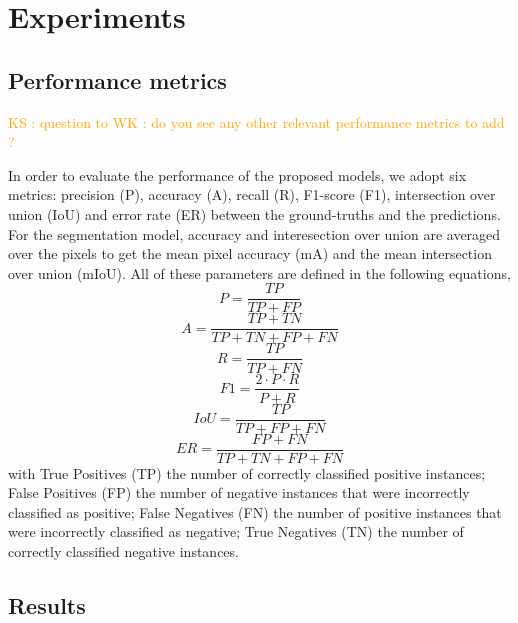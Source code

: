 \documentclass[amt, article]{copernicus}
\begin{document}
\section{Experiments}
\label{sec:experiments}

\subsection{Performance metrics}

\textcolor{orange}{KS : question to WK : do you see any other relevant performance metrics to add ?}

In order to evaluate the performance of the proposed models, we adopt six metrics: precision (P), accuracy (A), recall (R), F1-score (F1), intersection over union (IoU) and error rate (ER) between the ground-truths and the predictions. For the segmentation model, accuracy and interesection over union are averaged over the pixels to get the mean pixel accuracy (mA) and the mean intersection over union (mIoU). All of these parameters are defined in the following equations,
\begin{equation}
    P = \frac{TP}{TP + FP}
\end{equation}
\begin{equation}
    A = \frac{TP + TN}{TP + TN + FP + FN}
\end{equation}
\begin{equation}
    R = \frac{TP}{TP + FN}
\end{equation}
\begin{equation}
    F1 = \frac{2 \cdot P \cdot R}{P + R}
\end{equation}
\begin{equation}
    IoU = \frac{TP}{TP + FP + FN}
\end{equation}
\begin{equation}
    ER = \frac{FP + FN}{TP + TN + FP + FN}
\end{equation}
with True Positives (TP) the number of correctly classified positive instances; False Positives (FP) the number of negative instances that were incorrectly classified as positive; False Negatives (FN) the number of positive instances that were incorrectly classified as negative; True Negatives (TN) the number of correctly classified negative instances.

\subsection{Results}
\end{document}
